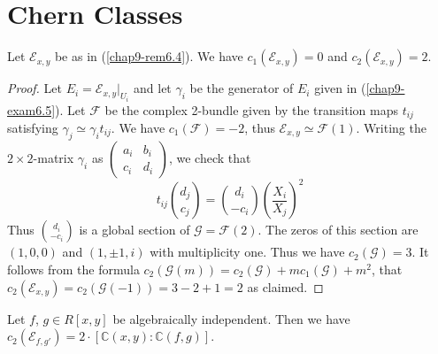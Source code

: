 \section{Chern Classes}\label{chap9-sec7}\pageoriginale

\begin{subprop}\label{chap9-prop7.1}
Let $\mathscr{E}_{x,y}$ be as in (\ref{chap9-rem6.4}). We have
$c_{1}(\mathscr{E}_{x,y})=0$ and $c_{2}(\mathscr{E}_{x,y})=2$. 
\end{subprop}

\begin{proof}
Let $E_{i}=\mathscr{E}_{x,y}|_{U_{i}}$ and let $\gamma_{i}$ be the
generator of $E_{i}$ given in (\ref{chap9-exam6.5}). Let $\mathscr{F}$
be the complex 2-bundle given by the transition maps $t_{ij}$
satisfying $\gamma_{j}\simeq \gamma_{i}t_{ij}$. We have
$c_{1}(\mathscr{F})=-2$, thus
$\mathscr{E}_{x,y}\simeq \mathscr{F}(1)$. Writing the $2\times
2$-matrix $\gamma_{i}$ as $\left(\begin{smallmatrix} a_{i} & b_{i}\\
c_{i} & d_{i}\end{smallmatrix}\right)$, we check that
$$
t_{ij}
\binom{d_{j}}{c_{j}}=
\binom{d_{i}}{-c_{i}}
\left(\dfrac{X_{i}}{X_{j}}\right)^{2}
$$
Thus $\binom{d_{i}}{-c_{i}}$ is a global section of
$\mathscr{G}=\mathscr{F}(2)$. The zeros of this section are $(1,0,0)$
and $(1,\pm 1,i)$ with multiplicity one. Thus we have
$c_{2}(\mathscr{G})=3$. It follows from the formula
$c_{2}(\mathscr{G}(m))=c_{2}(\mathscr{G})+mc_{1}(\mathscr{G})+m^{2}$,
that $c_{2}(\mathscr{E}_{x,y})=c_{2}(\mathscr{G}(-1))=3-2+1=2$ as
claimed. 
\end{proof}

\begin{subthm}\label{chap9-thm7.2}
Let $f$, $g\in R[x,y]$ be algebraically independent. Then we have
$c_{2}(\mathscr{E}_{f,g'})=2\cdot [\mathbb{C}(x,y):\mathbb{C}(f,g)]$. 
\end{subthm}

